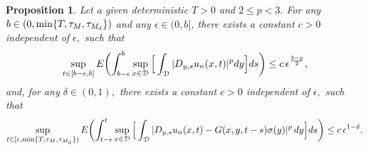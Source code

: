 \documentclass[reqno]{amsart}
\numberwithin{equation}{section}
\newtheorem{proposition}[theorem]{Proposition}
\begin{document}
\begin{proposition}
Let a given deterministic $T>0 $ and $ 2 \leq p < 3. $ For any $b\in(0,\min\{T,\tau_M,\tau_{M_{\rm d}}\})$ and any $\epsilon\in(0,b]$, there exists a constant $ c > 0 $ independent of $\epsilon, $ such that
\begin{equation}\label{51}
\sup_{t\in[b-\epsilon,b]}
E\biggl{(}\int_{b-\epsilon}^b\sup_{x\in\mathcal{D}} \Big{[}\int_{\mathcal{D}}|D_{y,s}u_n(x,t)|^p dy\Big{]} ds\biggr{)}\leq c\,\epsilon^{\frac{3-p}{2}},
\end{equation}
and, for any $ \delta\in (0,1), $ there exists a constant $ c > 0 $ independent of $\epsilon, $ such that
\begin{equation}\label{52}
\sup_{t\in [\epsilon,\min\{T,\tau_M,\tau_{M_{\rm
d}}\})} E\biggl{(}\int_{t-\epsilon}^t \sup_{x\in\mathcal{D}}
\Big{[}\int_{\mathcal{D}}|D_{y,s}u_n(x,t)-G(x,y,t-s)\sigma(y)|^p\,dy\Big{]}
ds\biggr{)}\\
\leq c\,\epsilon^{1-\delta}.
\end{equation}
\end{proposition}
\end{document}
